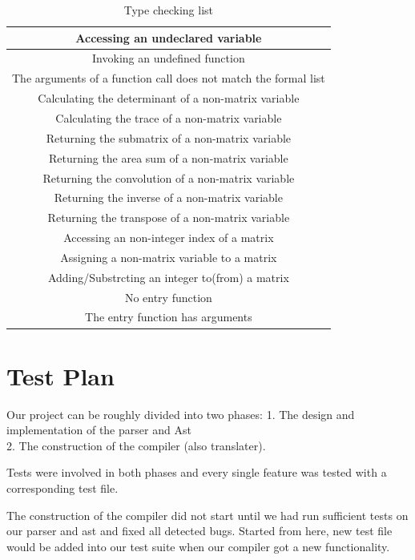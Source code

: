 \documentclass[12pt]{article} %
\begin{document}
\begin{table}
\centering
\caption{Type checking list}
\begin{tabular}{|c|} \hline
Accessing an undeclared variable \\ \hline
Invoking an undefined function \\ \hline
The arguments of a function call does not match the formal list\\ \hline
Calculating the determinant of a non-matrix variable \\ \hline
Calculating the trace of a non-matrix variable \\ \hline
Returning the submatrix of a non-matrix variable \\ \hline
Returning the area sum of a non-matrix variable \\ \hline
Returning the convolution of a non-matrix variable \\ \hline
Returning the inverse of a non-matrix variable \\ \hline
Returning the transpose of a non-matrix variable \\ \hline
Accessing an non-integer index of a matrix \\ \hline
Assigning a non-matrix variable to a matrix \\ \hline
Adding/Substrcting an integer to(from) a matrix \\ \hline
No entry function \\ \hline
The entry function has arguments \\ \hline
\end{tabular}
\end{table}


\section{Test Plan}
Our project can be roughly divided into two phases: 
1. The design and implementation of the parser and Ast\\
2. The construction of the compiler (also translater). 

Tests were involved in both phases and every single feature was tested with a corresponding test file. 

The construction of the compiler did not start until we had run sufficient tests on our parser and ast and fixed all detected bugs. Started from here, new test file would be added into our test suite when our compiler got a new functionality. 
\end{document}
